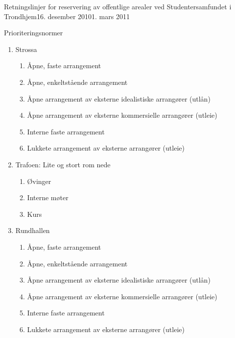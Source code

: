 \begin{instruks}{Retningslinjer for reservering av offentlige arealer
    ved Studentersamfundet i Trondhjem}{16. desember 2010}{1. mars 2011}
\begin{instruksledd}{Prioriteringsnormer}
\begin{enumerate}
\begin{enumerate}
\begin{enumerate}
                        \end{enumerate}
                        5 For eksempel stikkefest.
                    \item Strossa
                        \begin{enumerate}
                            \item  Åpne, faste arrangement
                            \item Åpne, enkeltstående arrangement
                            \item Åpne arrangement av eksterne idealistiske arrangører
                                (utlån)
                            \item Åpne arrangement av eksterne kommersielle arrangører
                                (utleie)
                            \item Interne faste arrangement
                            \item Lukkete arrangement av eksterne arrangører (utleie)
                        \end{enumerate}
                    \item Trafoen: Lite og stort rom nede
                        \begin{enumerate}
                            \item Øvinger
                            \item Interne møter
                            \item Kurs
                        \end{enumerate}
                    \item Rundhallen
                        \begin{enumerate}
                            \item Åpne, faste arrangement
                            \item Åpne, enkeltstående arrangement
                            \item Åpne arrangement av eksterne idealistiske arrangører (utlån)
                            \item Åpne arrangement av eksterne kommersielle arrangører (utleie)
                            \item Interne faste arrangement
                            \item Lukkete arrangement av eksterne arrangører (utleie)
                        \end{enumerate}
                \end{enumerate}
        \end{enumerate}
    \end{instruksledd}


\end{instruks}
